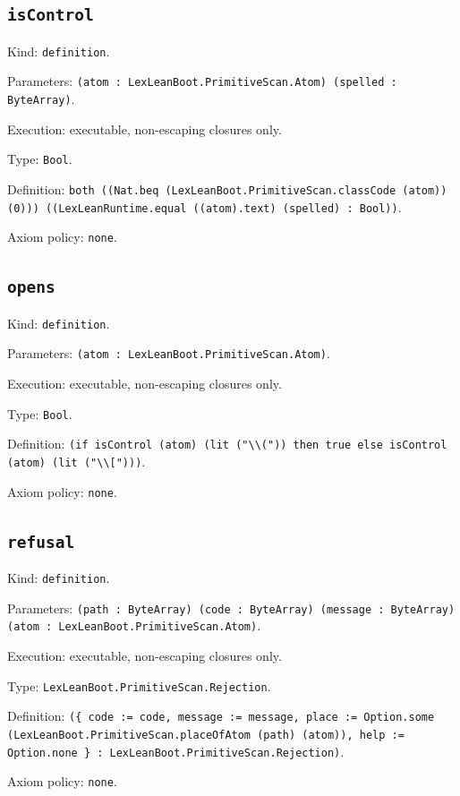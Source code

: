 \documentclass[11pt]{article}
\begin{document}
\subsection*{\texttt{isControl}}
\noindent Kind: \texttt{definition}.\par
\noindent Parameters: \texttt{(atom : LexLeanBoot.PrimitiveScan.Atom) (spelled : ByteArray)}.\par
\noindent Execution: executable, non-escaping closures only.\par
\noindent Type: \texttt{Bool}.\par
\noindent Definition: \texttt{both ((Nat.beq (LexLeanBoot.PrimitiveScan.classCode (atom)) (0))) ((LexLeanRuntime.equal ((atom).text) (spelled) : Bool))}.\par
\noindent Axiom policy: \texttt{none}.\par
\subsection*{\texttt{opens}}
\noindent Kind: \texttt{definition}.\par
\noindent Parameters: \texttt{(atom : LexLeanBoot.PrimitiveScan.Atom)}.\par
\noindent Execution: executable, non-escaping closures only.\par
\noindent Type: \texttt{Bool}.\par
\noindent Definition: \texttt{(if isControl (atom) (lit ("\textbackslash{}\textbackslash{}(")) then true else isControl (atom) (lit ("\textbackslash{}\textbackslash{}[")))}.\par
\noindent Axiom policy: \texttt{none}.\par
\subsection*{\texttt{refusal}}
\noindent Kind: \texttt{definition}.\par
\noindent Parameters: \texttt{(path : ByteArray) (code : ByteArray) (message : ByteArray) (atom : LexLeanBoot.PrimitiveScan.Atom)}.\par
\noindent Execution: executable, non-escaping closures only.\par
\noindent Type: \texttt{LexLeanBoot.PrimitiveScan.Rejection}.\par
\noindent Definition: \texttt{(\{ code := code, message := message, place := Option.some (LexLeanBoot.PrimitiveScan.placeOfAtom (path) (atom)), help := Option.none \} : LexLeanBoot.PrimitiveScan.Rejection)}.\par
\noindent Axiom policy: \texttt{none}.\par
\end{document}
